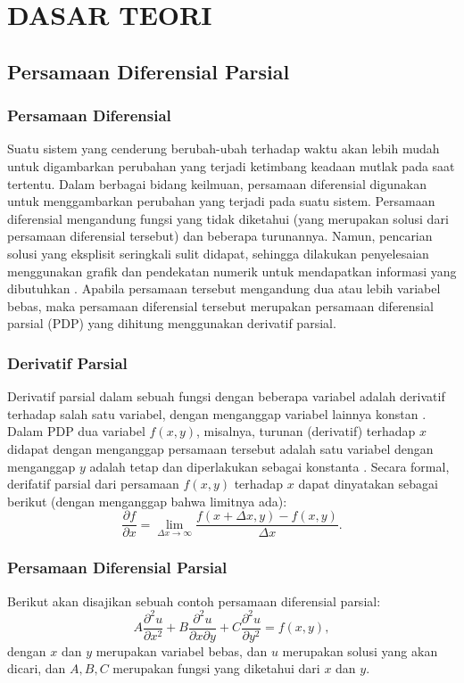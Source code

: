 \chapter{DASAR TEORI}

\section{Persamaan Diferensial Parsial}
\subsection{Persamaan Diferensial}
Suatu sistem yang cenderung berubah-ubah terhadap waktu akan lebih mudah untuk digambarkan perubahan yang terjadi ketimbang keadaan mutlak pada saat tertentu. Dalam berbagai bidang keilmuan, persamaan diferensial digunakan untuk menggambarkan perubahan yang terjadi pada suatu sistem. Persamaan diferensial mengandung fungsi yang tidak diketahui (yang merupakan solusi dari persamaan diferensial tersebut) dan beberapa turunannya. Namun, pencarian solusi yang eksplisit seringkali sulit didapat, sehingga dilakukan penyelesaian menggunakan grafik dan pendekatan numerik untuk mendapatkan informasi yang dibutuhkan \citep{stewart_2020_calculus}.  Apabila persamaan tersebut mengandung dua atau lebih variabel bebas, maka persamaan diferensial tersebut merupakan persamaan diferensial parsial (PDP) yang dihitung menggunakan derivatif parsial.
\subsection{Derivatif Parsial}
Derivatif parsial dalam sebuah fungsi dengan beberapa variabel adalah derivatif terhadap salah satu variabel, dengan menganggap variabel lainnya konstan \citep{robertalexanderadams_2014_calculus}. Dalam PDP dua variabel $f(x,y)$, misalnya, turunan (derivatif) terhadap $x$ didapat dengan menganggap persamaan tersebut adalah satu variabel dengan menganggap $y$ adalah tetap dan diperlakukan sebagai konstanta \citep{riley_2006_mathematical}. Secara formal, derifatif parsial dari persamaan $f(x,y)$ terhadap $x$ dapat dinyatakan sebagai berikut (dengan menganggap bahwa limitnya ada):
\begin{equation} \label{partial_limit}
\frac{\partial f}{\partial x} = \lim_{\Delta x\to\infty} \frac{f(x+\Delta x,y)-f(x,y)}{\Delta x}.
\end{equation}
\subsection{Persamaan Diferensial Parsial}
Berikut akan disajikan sebuah contoh persamaan diferensial parsial:
\begin{equation} \label{partial_orde_dua}
    A \frac{\partial^2 u}{\partial x ^2} + B\frac{\partial^2 u}{\partial x \partial y} + C\frac{\partial^2u}{\partial y ^2} = f(x,y),
\end{equation}
dengan $x$ dan $y$ merupakan variabel bebas, dan $u$ merupakan solusi yang akan dicari, dan $A, B, C$ merupakan fungsi yang diketahui dari $x$ dan $y$.

